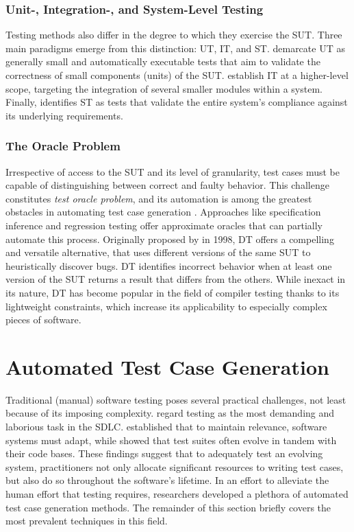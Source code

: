 \subsubsection{Unit-, Integration-, and System-Level Testing}

Testing methods also differ in the degree to which they exercise the \gls{SUT}.
Three main paradigms emerge from this distinction: 
\Gls{UT}, \Gls{IT}, and \gls{ST}.
\citet{daka2014survey} demarcate \gls{UT} as 
generally small and automatically executable tests that aim
to validate the correctness of small components (units) of the \gls{SUT}.
\citet{leung1990study} establish \gls{IT} at a higher-level scope, targeting
the integration of several smaller modules within a system.
Finally, \citet{umar2020comprehensive} identifies \gls{ST} as tests
that validate the entire system's compliance against its underlying
requirements.

\subsubsection{The Oracle Problem}

Irrespective of access to the \gls{SUT}
and its level of granularity, test cases must be capable
of distinguishing between correct and faulty behavior.
This challenge constitutes
\textit{test oracle problem}, and its automation is among the 
greatest obstacles in automating test case generation \citep{barr2014oracle}.
Approaches like specification inference and regression testing offer
approximate oracles that can partially automate this process.
Originally proposed by \citet{mckeeman1998differential} in 1998, \Gls{DT}
offers a compelling and versatile alternative, that uses different versions
of the same \gls{SUT} to heuristically discover bugs.
\gls{DT} identifies incorrect behavior when at least
one version of the \gls{SUT} returns a result that differs from the others.
While inexact in its nature, \gls{DT} has become popular
in the field of compiler testing thanks to its lightweight 
constraints, which increase its applicability to especially complex
pieces of software.

\section{Automated Test Case Generation}

Traditional (manual) software testing poses several practical
challenges, not least because of its imposing complexity.
\citet{candea2019automated} regard testing as the most
demanding and laborious task in the \gls{SDLC}.
\citet{lehman1979understanding} established that to maintain
relevance, software systems must adapt, while \citet{zaidman2011studying}
showed that test suites often evolve in tandem with their code bases.
These findings suggest that to adequately test an evolving system,
practitioners not only allocate significant resources to writing test cases,
but also do so throughout the software's lifetime.
In an effort to alleviate the human effort that testing requires,
researchers developed a plethora of automated test case generation methods.
The remainder of this section briefly covers the most prevalent techniques
in this field.

